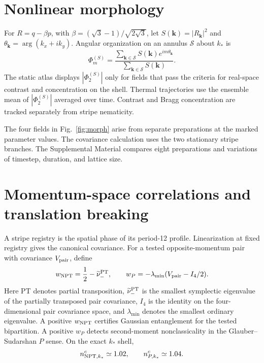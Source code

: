 \documentclass[aps,prl,twocolumn,superscriptaddress,nofootinbib,floatfix]{revtex4-2}
\begin{document}
\section{Nonlinear morphology}
For $R=q-\beta p$, with $\beta=(\sqrt3-1)/\sqrt{2\sqrt3}$, let $S(\bm k)=|R_{\bm k}|^2$ and $\theta_{\bm k}=\arg(k_x+ik_y)$. Angular organization on an annulus $\mathcal S$ about $k_*$ is
\begin{equation}
 \Phi_m^{(S)}=
 \frac{\sum_{\bm k\in\mathcal S}S(\bm k)e^{im\theta_{\bm k}}}
 {\sum_{\bm k\in\mathcal S}S(\bm k)}.
 \label{eq:phi}
\end{equation}
The static atlas displays $|\Phi_2^{(S)}|$ only for fields that pass the criteria for real-space contrast and concentration on the shell. Thermal trajectories use the ensemble mean of $|\Phi_2^{(S)}|$ averaged over time. Contrast and Bragg concentration are tracked separately from stripe nematicity.

The four fields in Fig.~\ref{fig:morph} arise from separate preparations at the marked parameter values. The covariance calculation uses the two stationary stripe branches. The Supplemental Material compares eight preparations and variations of timestep, duration, and lattice size.

\section{Momentum-space correlations and translation breaking}
A stripe registry is the spatial phase of its period-12 profile. Linearization at fixed registry gives the canonical covariance. For a tested opposite-momentum pair with covariance $V_{\rm pair}$, define
\begin{equation}
 w_{\rm NPT}=\frac12-\widetilde\nu_-^{\rm PT},
 \qquad w_P=-\lambda_{\min}(V_{\rm pair}-I_4/2).
 \label{eq:witnesses}
\end{equation}
Here PT denotes partial transposition, $\widetilde\nu_-^{\rm PT}$ is the smallest symplectic eigenvalue of the partially transposed pair covariance, $I_4$ is the identity on the four-dimensional pair covariance space, and $\lambda_{\min}$ denotes the smallest ordinary eigenvalue. A positive $w_{\rm NPT}$ certifies Gaussian entanglement for the tested bipartition. A positive $w_P$ detects second-moment nonclassicality in the Glauber--Sudarshan $P$ sense. On the exact $k_*$ shell,
\begin{equation}
 n_{{\rm NPT},k_*}^{c}\simeq1.02,
 \qquad n_{P,k_*}^{c}\simeq1.04.
 \label{eq:shellBounds}
\end{equation}
\end{document}
